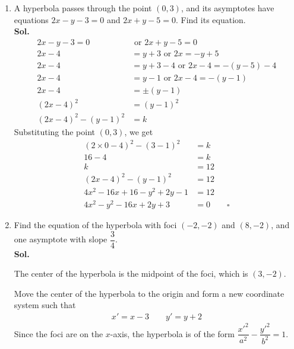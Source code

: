 \documentclass{report}
\newcommand{\sol}{\vspace{1em}\\\textbf{Sol.}}
\newcommand{\eos}{ \qquad \square}
\begin{document}
\begin{enumerate}[leftmargin=*]
    \item A hyperbola passes through the point $(0,3)$, and its asymptotes have equations
          $2x-y-3=0$ and $2x+y-5=0$. Find its equation. \sol{}
          \begin{align*}
              2x - y - 3 = 0         & \text{ or } 2x + y - 5 = 0                    \\
              2x - 4                 & = y + 3 \text{ or } 2x = -y + 5               \\
              2x - 4                 & = y + 3 - 4 \text{ or } 2x - 4 = -(y - 5) - 4 \\
              2x - 4                 & = y - 1 \text{ or } 2x - 4 = - (y - 1)        \\
              2x - 4                 & = \pm (y - 1)                                 \\
              (2x - 4)^2             & = (y - 1)^2                                   \\
              (2x - 4)^2 - (y - 1)^2 & = k
          \end{align*}
          Substituting the point $(0,3)$, we get
          \begin{align*}
              (2 \times 0 - 4)^2 - (3 - 1)^2 & = k      \\
              16 - 4                         & = k      \\
              k                              & = 12     \\
              (2x - 4)^2 - (y - 1)^2         & = 12     \\
              4x^2 - 16x + 16 - y^2 + 2y - 1 & = 12     \\
              4x^2 - y^2 - 16x + 2y + 3      & = 0 \eos
          \end{align*}

          \newpage
    \item Find the equation of the hyperbola with foci $(-2,-2)$ and $(8,-2)$, and one
          asymptote with slope $\dfrac{3}{4}$. \sol{}

          The center of the hyperbola is the midpoint of the foci, which is $(3,-2)$.

          Move the center of the hyperbola to the origin and form a new coordinate system
          such that
          \begin{align*}
              x' = x-3 \qquad y' = y+2
          \end{align*}
          Since the foci are on the $x$-axis, the hyperbola is of the form $\dfrac{x'^2}{a^2}-\dfrac{y'^2}{b^2}=1$.


\end{enumerate}
\end{document}
